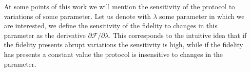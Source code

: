 At some points of this work we will mention the sensitivity of the protocol to variations of some parameter. Let us denote with $\lambda$ some parameter in which we are interested, we define the sensitivity of the fidelity to changes in this parameter as the derivative $\partial \mathcal{F}/\partial \lambda$. This corresponds to the intuitive idea that if the fidelity presents abrupt variations the sensitivity is high, while if the fidelity has presents a constant value the protocol is insensitive to changes in the parameter.





